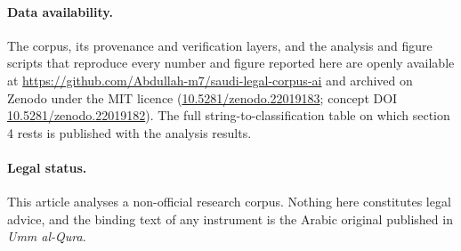\documentclass[11pt]{article}
\begin{document}
\paragraph{Data availability.} The corpus, its provenance and verification
layers, and the analysis and figure scripts that reproduce every number and
figure reported here are openly available at
\url{https://github.com/Abdullah-m7/saudi-legal-corpus-ai} and archived on
Zenodo under the MIT licence
(\href{https://doi.org/10.5281/zenodo.22019183}{10.5281/zenodo.22019183};
concept DOI
\href{https://doi.org/10.5281/zenodo.22019182}{10.5281/zenodo.22019182}).
The full string-to-classification table on which section 4 rests is published
with the analysis results.

\paragraph{Legal status.} This article analyses a non-official research corpus.
Nothing here constitutes legal advice, and the binding text of any instrument
is the Arabic original published in \emph{Umm al-Qura}.
\fi
\end{document}
